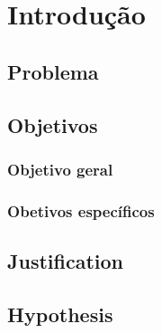 \chapter{Introdução}\label{ch:intro}
	
	\section{Problema}
	
	
	\section{Objetivos}
	
	\subsection{Objetivo geral}
	
	\subsection{Obetivos específicos}
	
%
	
	\section{Justification}

	\section{Hypothesis}
